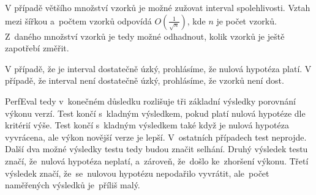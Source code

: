 V případě většího množství vzorků je možné zužovat interval spolehlivosti. Vztah mezi
šířkou a~počtem vzorků odpovídá $O(\frac{1}{\sqrt{n}})$, kde $n$ je počet vzorků. Z~daného
množství vzorků je tedy možné odhadnout, kolik vzorků je ještě zapotřebí změřit.

V případě, že je interval dostatečně úzký, prohlásíme, že nulová hypotéza platí.
V případě, že interval není dostatečně úzký, prohlásíme, že vzorků není dost.

PerfEval tedy v~konečném důsledku rozlišuje tři základní výsledky porovnání výkonu verzí.
Test končí s~kladným výsledkem, pokud platí nulová hypotéze dle kritérií výše. Test
končí s~kladným výsledkem také když je nulová hypotéza vyvrácena, ale výkon novější verze je lepší.
V~ostatních případech test neprojde. Další dva možné výsledky testu tedy budou značit selhání.
Druhý výsledek testu značí, že~nulová hypotéza neplatí, a~zároveň, že~došlo ke~zhoršení výkonu.
Třetí výsledek značí, že~se~nulovou hypotézu nepodařilo vyvrátit, ale~počet naměřených výsledků
je~příliš malý.
